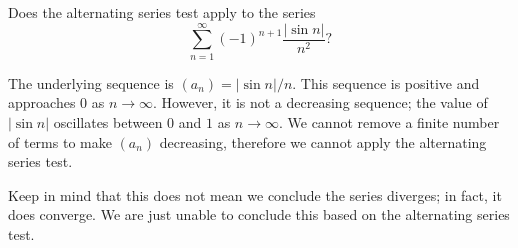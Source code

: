 \documentclass{ximera}
\begin{document}
    \begin{question}
      Does the alternating series test apply to the series
      \[
      \sum_{n=1}^\infty (-1)^{n+1}\frac{|\sin n|}{n^2}?
      \]
      \begin{prompt}
        \begin{multipleChoice}
        \end{multipleChoice}
        \begin{feedback}
          The underlying sequence is $\left(a_n\right) = |\sin n|/n$. This
          sequence is positive and approaches $0$ as
          $n\to\infty$. However, it is not a decreasing sequence; the
          value of $|\sin n|$ oscillates between $0$ and $1$ as
          $n\to\infty$. We cannot remove a finite number of terms to
          make $\left(a_n\right)$ decreasing, therefore we cannot apply the
          alternating series test.
	  
          Keep in mind that this does not mean we conclude the series
          diverges; in fact, it does converge. We are just unable to
          conclude this based on the alternating series test.
        \end{feedback}
      \end{prompt}
    \end{question}
\end{document}
